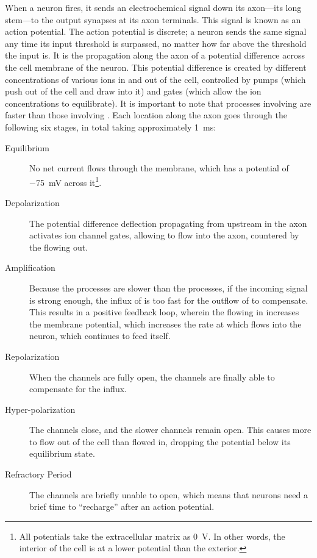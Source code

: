 When a neuron fires, it sends an electrochemical signal down its axon---its long stem---to the output synapses at its axon terminals.
This signal is known as an action potential.
The action potential is discrete; a neuron sends the same signal any time its input threshold is surpassed, no matter how far above the threshold the input is.
It is the propagation along the axon of a potential difference across the cell membrane of the neuron.
This potential difference is created by different concentrations of various ions in and out of the cell, controlled by pumps (which push  out of the cell and draw  into it) and gates (which allow the ion concentrations to equilibrate).
It is important to note that processes involving  are faster than those involving .
Each location along the axon goes through the following six stages, in total taking approximately \SI{1}{\ms}:
\begin{description}
\item[Equilibrium] No net current flows through the membrane, which has a potential of \SI{-75}{\mV} across it\footnote{All potentials take the extracellular matrix as \SI{0}{\V}.  In other words, the interior of the cell is at a lower potential than the exterior.}.

\item[Depolarization] The potential difference deflection propagating from upstream in the axon activates ion channel gates, allowing  to flow into the axon, countered by the  flowing out.

\item[Amplification] Because the  processes are slower than the  processes, if the incoming signal is strong enough, the influx of  is too fast for the outflow of  to compensate.
  This results in a positive feedback loop, wherein the  flowing in increases the membrane potential, which increases the rate at which  flows into the neuron, which continues to feed itself.

\item[Repolarization] When the  channels are fully open, the  channels are finally able to compensate for the influx.

\item[Hyper-polarization] The  channels close, and the slower  channels remain open.
  This causes more  to flow out of the cell than  flowed in, dropping the potential below its equilibrium state.

\item[Refractory Period] The  channels are briefly unable to open, which means that neurons need a brief time to ``recharge'' after an action potential.

\end{description}

